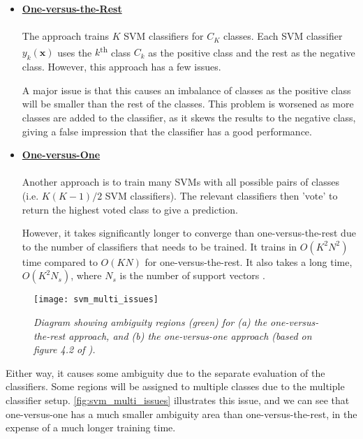 \begin{itemize}
  \item \textbf{\underline{One-versus-the-Rest}} \\ \\
    The approach trains $K$ SVM classifiers for $C_K$ classes. Each SVM classifier $y_k(\mathbf{x})$ uses the $k$\textsuperscript{th} class $C_k$ as the positive class and the rest as the negative class. However, this approach has a few issues. 

A major issue is that this causes an imbalance of classes as the positive class will be smaller than the rest of the classes. This problem is worsened as more classes are added to the classifier, as it skews the results to the negative class, giving a false impression that the classifier has a good performance.
\\

  \item \textbf{\underline{One-versus-One}} \\ \\
Another approach is to train many SVMs with all possible pairs of classes (i.e. $K(K-1)/2$ SVM classifiers). The relevant classifiers then 'vote' to return the highest voted class to give a prediction.

However, it takes significantly longer to converge than one-versus-the-rest due to the number of classifiers that needs to be trained. It trains in $O(K^2N^2)$ time compared to $O(KN)$ for one-versus-the-rest. It also takes a long time, $O(K^2N_{s})$, where $N_s$ is the number of support vectors \cite{mur-book}. 

\end{itemize}

\begin{figure}[H]
  \centering
  \texttt{[image: svm\_multi\_issues]}
  \caption{\textit{Diagram showing ambiguity regions (green) for (a) the one-versus-the-rest approach, and (b) the one-versus-one approach (based on figure 4.2 of \protect{}).}}
  \label{fig:svm_multi_issues}
\end{figure}

Either way, it causes some ambiguity due to the separate evaluation of the classifiers. Some regions will be assigned to multiple classes due to the multiple classifier setup. \autoref{fig:svm_multi_issues} illustrates this issue, and we can see that one-versus-one has a much smaller ambiguity area than one-versus-the-rest, in the expense of a much longer training time.


